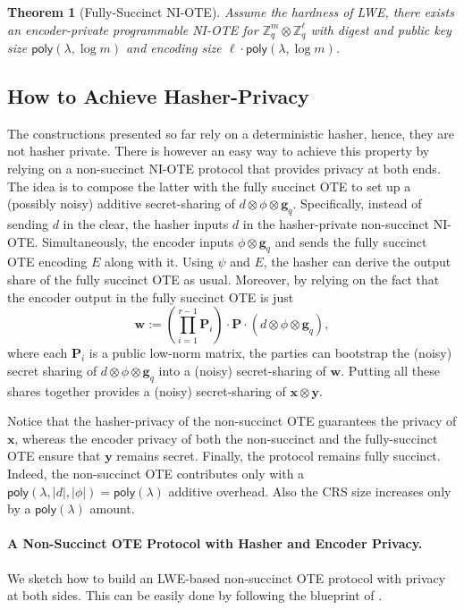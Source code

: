 \documentclass{article}
\newtheorem{theorem}{Theorem}\newtheorem{lemma}[theorem]{Lemma}\newtheorem{proposition}[theorem]{Proposition}\newtheorem{corollary}[theorem]{Corollary}\newtheorem{definition}[theorem]{Definition}\newtheorem{claim}[theorem]{Claim}
\newcommand{\poly}{\mathsf{poly}}
\renewcommand{\sec}{\ensuremath{\lambda}}
\begin{document}
{
\begin{theorem}[Fully-Succinct NI-OTE]
Assume the hardness of LWE, there exists an
encoder-private programmable NI-OTE for
$\mathbb Z_q^m \otimes \mathbb Z_q^\ell$ with digest and public key size $\poly(\lambda,\log m)$ and encoding size $\ell \cdot \poly(\lambda,\log m)$.
\end{theorem}
}
{
\subsection{How to Achieve Hasher-Privacy}
The constructions presented so far rely on a deterministic hasher, hence, they are not hasher private. There is however an easy way to achieve this property by relying on a non-succinct NI-OTE protocol that provides privacy at both ends. The idea is to compose the latter with the fully succinct OTE to set up a (possibly noisy) additive secret-sharing of $d\otimes \phi\otimes \mathbf{g}_q$. Specifically, instead of sending $d$ in the clear, the hasher inputs $d$ in the hasher-private non-succinct NI-OTE. Simultaneously, the encoder inputs $\phi\otimes \mathbf{g}_q$ and sends the fully succinct OTE encoding $E$ along with it. Using $\psi$ and $E$, the hasher can derive the output share of the fully succinct OTE as usual. Moreover, by relying on the fact that the encoder output in the fully succinct OTE is just
\[\mathbf{w}:=\left(\prod_{i=1}^{r-1}\mathbf{P}_i\right)\cdot \mathbf{P} \cdot (d\otimes \phi\otimes \mathbf{g}_q),\]
where each $\mathbf{P}_i$ is  a public low-norm matrix, the parties can bootstrap the (noisy) secret sharing of $d\otimes \phi\otimes \mathbf{g}_q$ into a (noisy) secret-sharing of $\mathbf{w}$. Putting all these shares together provides a (noisy) secret-sharing of $\mathbf{x}\otimes \mathbf{y}$.}

{
Notice that the hasher-privacy of the non-succinct OTE guarantees the privacy of $\mathbf{x}$, whereas the encoder privacy of both the non-succinct and the fully-succinct OTE ensure that $\mathbf{y}$ remains secret. Finally, the protocol remains fully succinct. Indeed, the non-succinct OTE contributes only with a $\poly(\sec, \lvert d\rvert, \lvert \phi\rvert)=\poly(\sec)$ additive overhead. Also the CRS size increases only by a $\poly(\sec)$ amount.}

{
\paragraph{A Non-Succinct OTE Protocol with Hasher and Encoder Privacy.} We sketch how to build an LWE-based non-succinct OTE protocol with privacy at both sides. This can be easily done by following the blueprint of \cite{EC:OrlSchYak21,C:ADOS22,EC:AbrRoySch24}.}
\end{document}
